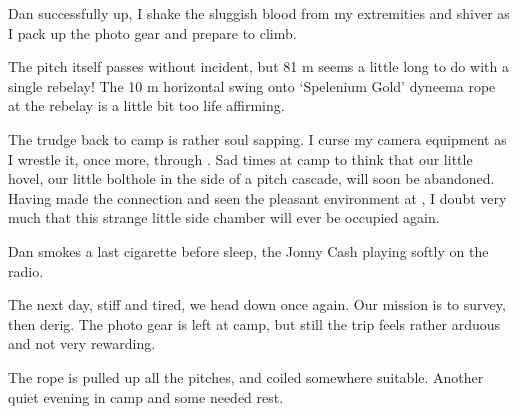 Dan successfully up, I shake the sluggish blood from my extremities and
shiver as I pack up the photo gear and prepare to climb.

The pitch itself passes without incident, but 81 m seems a little long
to do with a single rebelay! The 10 m horizontal swing onto `Spelenium
Gold' dyneema rope at the rebelay is a little bit too life affirming.

The trudge back to camp is rather soul sapping. I curse my camera
equipment as I wrestle it, once more, through . Sad
times at camp to think that our little hovel, our little bolthole in the
side of a pitch cascade, will soon be abandoned. Having made the
connection and seen the pleasant environment at , I doubt
very much that this strange little side chamber will ever be occupied
again.


Dan smokes a last cigarette before sleep, the Jonny Cash playing softly
on the radio.

The next day, stiff and tired, we head down once again. Our mission is
to survey, then derig. The photo gear is left at camp, but still the
trip feels rather arduous and not very rewarding.

The rope is pulled up all the pitches, and coiled somewhere suitable.
Another quiet evening in camp and some needed rest.


